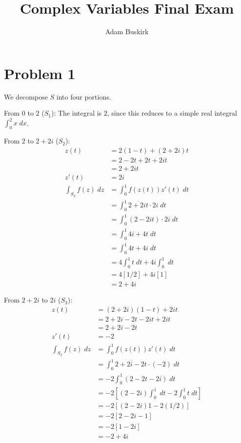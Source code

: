 \documentclass{article}
\title{Complex Variables Final Exam}
\author{Adam Buskirk}
\theoremstyle{definition}
\newcommand{\sq}[1]{\left[#1\right]}
\begin{document}
\maketitle

\section{Problem 1}
We decompose $S$ into four portions.

From $0$ to $2$ ($S_1$):
The integral is $2$, since this reduces to a simple real integral $\int_0^2 x \;dx$.

From $2$ to $2+2i$ ($S_2$):
\begin{align*}
z(t) &= 2(1-t) + (2+2i)t \\
&= 2 - 2t + 2t + 2it \\
&= 2 + 2it \\
z'(t) &= 2i \\
\int_{S_2} f(z) \;dz
&= \int_0^1 f(z(t)) z'(t) \;dt \\
&= \int_0^1 \overline{2+2it} \cdot 2i \;dt \\
&= \int_0^1 (2-2it) \cdot 2i \;dt \\
&= \int_0^1 4i+4t \;dt \\
&= \int_0^1 4t + 4i \;dt \\
&= 4 \int_0^1 t \;dt + 4i \int_0^1 \;dt \\
&= 4 \sq{1/2} + 4i \sq{1}\\
&= 2+4i
\end{align*}

From $2+2i$ to $2i$ ($S_3$):
\begin{align*}
z(t) 
&= (2+2i)(1-t) + 2it \\
&= 2+2i-2t-2it+2it \\
&= 2+2i-2t \\
z'(t)
&= -2 \\
\int_{S_3} f(z) \;dz
&= \int_0^1 f(z(t)) z'(t) \;dt\\
&= \int_0^1 \overline{2+2i-2t} \cdot (-2) \;dt \\
&= -2 \int_0^1 (2-2t - 2i) \;dt \\
&= -2 \sq{(2-2i)\int_0^1 \;dt - 2\int_0^1 t\;dt}\\
&= -2 \sq{(2-2i) 1 - 2 (1/2)}\\
&= -2 \sq{2-2i - 1}\\
&= -2 \sq{1-2i}\\
&= -2 + 4i
\end{align*}
\end{document}
